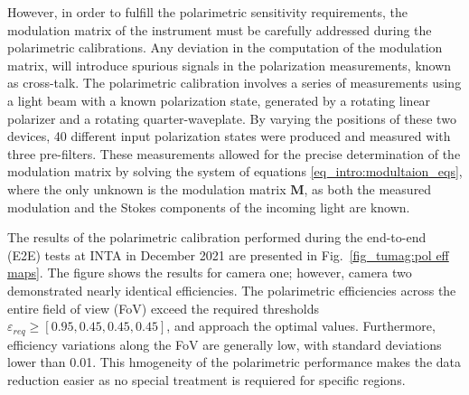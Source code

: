 However, in order to fulfill the polarimetric sensitivity requirements, the modulation matrix of the instrument must be carefully addressed during the polarimetric calibrations. Any deviation in the computation of the modulation matrix, will introduce spurious signals in the polarization measurements, known as cross-talk. The polarimetric calibration involves a series of measurements using a light beam with a known polarization state, generated by a rotating linear polarizer and a rotating quarter-waveplate. By varying the positions of these two devices, 40 different input polarization states were produced and measured with three pre-filters. These measurements allowed for the precise determination of the modulation matrix by solving the system of equations \eqref{eq_intro:modultaion_eqs}, where the only unknown is the modulation matrix $\textbf{M}$, as both the measured modulation and the Stokes components of the incoming light are known.

The results of the polarimetric calibration performed during the end-to-end (E2E) tests at INTA in December 2021 are presented in Fig.~\ref{fig_tumag:pol eff maps}. The figure shows the results for camera one; however, camera two demonstrated nearly identical efficiencies. The polarimetric efficiencies across the entire field of view (FoV) exceed the required thresholds $\varepsilon _{req} \geqslant [0.95, 0.45, 0.45, 0.45]$, and approach the optimal values. Furthermore, efficiency variations along the FoV are generally low, with standard deviations lower than 0.01. This hmogeneity of the polarimetric performance makes the data reduction easier as no special treatment is requiered for specific regions.  




